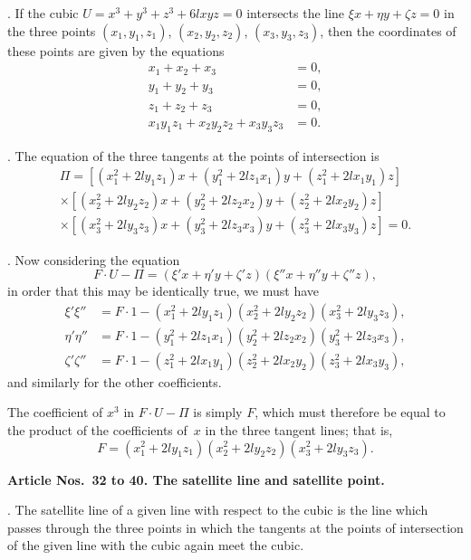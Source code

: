 \documentclass[11pt,a4paper]{book}
\begin{document}
\begin{center}
. If the cubic $U = x^{3} + y^{3} + z^{3} + 6lxyz = 0$
intersects the line $\xi x + \eta y + \zeta z = 0$ in the three points
$(x_{1}, y_{1}, z_{1})$, $(x_{2}, y_{2}, z_{2})$, $(x_{3}, y_{3}, z_{3})$, then the coordinates
of these points are given by the equations
\begin{align*}
x_{1} + x_{2} + x_{3} &= 0, \\
y_{1} + y_{2} + y_{3} &= 0, \\
z_{1} + z_{2} + z_{3} &= 0, \\
x_{1}y_{1}z_{1} + x_{2}y_{2}z_{2} + x_{3}y_{3}z_{3} &= 0.
\end{align*}

. The equation of the three tangents at the points of
intersection is
\begin{multline*}
\Pi = [(x_{1}^{2} + 2ly_{1}z_{1})x + (y_{1}^{2} + 2lz_{1}x_{1})y + (z_{1}^{2} + 2lx_{1}y_{1})z] \\
\times [(x_{2}^{2} + 2ly_{2}z_{2})x + (y_{2}^{2} + 2lz_{2}x_{2})y + (z_{2}^{2} + 2lx_{2}y_{2})z] \\
\times [(x_{3}^{2} + 2ly_{3}z_{3})x + (y_{3}^{2} + 2lz_{3}x_{3})y + (z_{3}^{2} + 2lx_{3}y_{3})z] = 0.
\end{multline*}

. Now considering the equation
\[
F \cdot U - \Pi = (\xi' x + \eta' y + \zeta' z)(\xi'' x + \eta'' y + \zeta'' z),
\]
in order that this may be identically true, we must have
\begin{align*}
\xi'\xi'' &= F \cdot 1 - (x_{1}^{2} + 2ly_{1}z_{1})(x_{2}^{2} + 2ly_{2}z_{2})(x_{3}^{2} + 2ly_{3}z_{3}), \\
\eta'\eta'' &= F \cdot 1 - (y_{1}^{2} + 2lz_{1}x_{1})(y_{2}^{2} + 2lz_{2}x_{2})(y_{3}^{2} + 2lz_{3}x_{3}), \\
\zeta'\zeta'' &= F \cdot 1 - (z_{1}^{2} + 2lx_{1}y_{1})(z_{2}^{2} + 2lx_{2}y_{2})(z_{3}^{2} + 2lx_{3}y_{3}),
\end{align*}
and similarly for the other coefficients.

The coefficient of $x^{3}$ in $F \cdot U - \Pi$ is simply $F$, which
must therefore be equal to the product of the coefficients of~$x$
in the three tangent lines; that is,
\[
F = (x_{1}^{2} + 2ly_{1}z_{1})(x_{2}^{2} + 2ly_{2}z_{2})(x_{3}^{2} + 2ly_{3}z_{3}).
\]

\medskip\noindent\textbf{Article Nos.~32 to 40. The satellite line and satellite point.}

. The satellite line of a given line with respect to the
cubic is the line which passes through the three points in which
the tangents at the points of intersection of the given line with
the cubic again meet the cubic.


\end{center}
\end{document}
